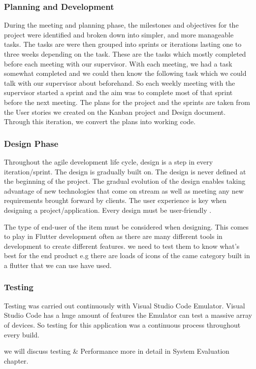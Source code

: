 \subsubsection{Planning and Development}
During the meeting and planning phase, the milestones and objectives for the
project were identified and broken down into simpler, and more manageable tasks. The tasks are were then grouped into sprints or iterations lasting one
to three weeks depending on the task. These are the tasks which mostly completed before each meeting with our supervisor. With each meeting, we had a task somewhat completed and we could then know the following task which we could
talk with our supervisor about beforehand. So each weekly meeting with the
supervisor started a sprint and the aim was to complete most of that sprint
before the next meeting. The plans for the project and the sprints are taken
from the User stories we created on the Kanban project and Design document.
Through this iteration, we convert the plans into working code.
\subsubsection{Design Phase}
Throughout the agile development life cycle, design is a step in every iteration/sprint. The design is gradually built on. The design is never defined at the beginning of the project. The gradual evolution of the design enables taking advantage of new technologies that come on stream as well as meeting any
new requirements brought forward by clients. The user experience is key when
designing a project/application. Every design must be user-friendly \cite{AgileSof90:online}.

The type of end-user of the item must be considered when designing. This comes to play in Flutter development often as there are many different tools in development to create different features. we need to test them to know what's best for the end product e.g there are loads of icons of the came category built in a flutter that we can use have used.
\subsubsection{Testing}
Testing was carried out continuously with Visual Studio Code Emulator. Visual Studio Code has a huge amount of features the Emulator can test
a massive array of devices. So testing for this application was a continuous
process throughout every build.

we will discuss testing \& Performance more in detail in System Evaluation chapter.

